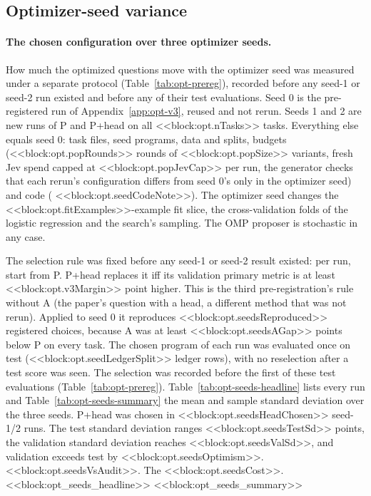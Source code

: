 \subsection{Optimizer-seed variance}\label{app:opt-seeds}
\paragraph{The chosen configuration over three optimizer seeds.}
How much the optimized questions move with the optimizer seed was measured under a separate protocol (Table~\ref{tab:opt-prereg}), recorded before any seed-1 or seed-2 run existed and before any of their test evaluations. Seed 0 is the pre-registered run of Appendix~\ref{app:opt-v3}, reused and not rerun. Seeds 1 and 2 are new runs of P and P+head on all <<block:opt.nTasks>> tasks. Everything else equals seed 0: task files, seed programs, data and splits, budgets (<<block:opt.popRounds>> rounds of <<block:opt.popSize>> variants, fresh Jev spend capped at <<block:opt.popJevCap>> per run, the generator checks that each rerun's configuration differs from seed 0's only in the optimizer seed) and code (\jevopt{} <<block:opt.seedCodeNote>>). The optimizer seed changes the <<block:opt.fitExamples>>-example fit slice, the cross-validation folds of the logistic regression and the search's sampling. The OMP proposer is stochastic in any case.

The selection rule was fixed before any seed-1 or seed-2 result existed: per run, start from P. P+head replaces it iff its validation primary metric is at least <<block:opt.v3Margin>> point higher. This is the third pre-registration's rule without A (the paper's question with a head, a different method that was not rerun). Applied to seed 0 it reproduces <<block:opt.seedsReproduced>> registered choices, because A was at least <<block:opt.seedsAGap>> points below P on every task. The chosen program of each run was evaluated once on test (<<block:opt.seedLedgerSplit>> ledger rows), with no reselection after a test score was seen. The selection was recorded before the first of these test evaluations (Table~\ref{tab:opt-prereg}). Table~\ref{tab:opt-seeds-headline} lists every run and Table~\ref{tab:opt-seeds-summary} the mean and sample standard deviation over the three seeds. P+head was chosen in <<block:opt.seedsHeadChosen>> seed-1/2 runs. The test standard deviation ranges <<block:opt.seedsTestSd>> points, the validation standard deviation reaches <<block:opt.seedsValSd>>, and validation exceeds test by <<block:opt.seedsOptimism>>. <<block:opt.seedsVsAudit>>. The <<block:opt.seedsCost>>.
<<block:opt_seeds_headline>>
<<block:opt_seeds_summary>>

